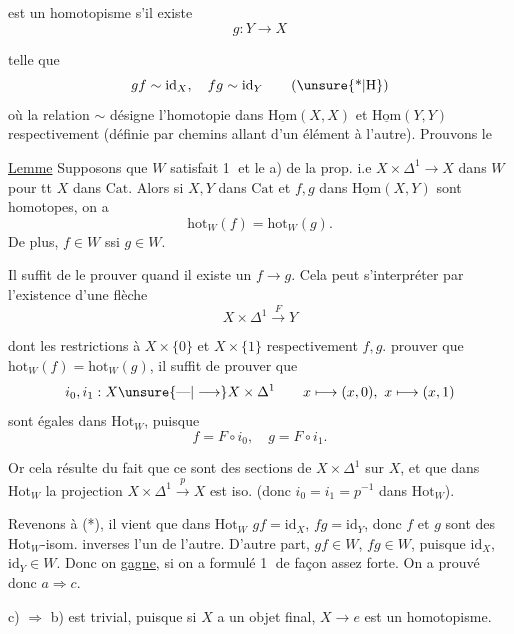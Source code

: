 
est un homotopisme s'il existe  
\[
g:Y\longrightarrow X
\]

telle que
\[
gf\sim\mathrm{id}_X,\quad fg\sim\mathrm{id}_Y \tag*{(\unsure{*|H})}
\]
où la relation $\sim$ désigne l'homotopie dans $\underline{\mathrm{Hom}}(X,X)$ et $\underline{\mathrm{Hom}}(Y,Y)$ respectivement (définie par chemins allant d'un élément à l'autre). Prouvons le

\uline{Lemme} Supposons que $W$ satisfait \textcircled{1} et le a) de la prop. i.e $X\times\Delta^1\longrightarrow X$ dans $W$ pour tt $X$ dans $\mathrm{Cat}$. Alors si  $X,Y$ dans $\mathrm{Cat}$ et $f,g$ dans $\underline{\mathrm{Hom}}(X,Y)$ sont homotopes, on a
\[
\mathrm{hot}_W(f)=\mathrm{hot}_W(g).
\]
De plus,  $f\in W$ ssi $g\in W$.

Il suffit de le prouver quand il existe un  $f\longrightarrow g$. Cela peut s'interpréter par l'existence d'une flèche
\[
X\times\Delta^1\xrightarrow{F}Y
\]

dont les restrictions à $X\times\{0\}$ et $X\times\{1\}$ respectivement  $f,g$.  prouver que $\mathrm{hot}_W(f)=\mathrm{hot}_W(g)$, il suffit de prouver que
\[
i_0,i_1:X\unsure{\text{---}|\longrightarrow}X\times\Delta^1
\qquad x\longmapsto(x,0),\ x\longmapsto(x,1)
\]
sont égales dans $\mathrm{Hot}_W$, puisque
\[
f=F\circ i_0,\quad g=F\circ i_1.
\]

Or cela résulte du fait que ce sont des sections de $X\times\Delta^1$ sur $X$, et que dans $\mathrm{Hot}_W$ la projection $X\times\Delta^1\xrightarrow{p}X$ est iso. (donc $i_0=i_1=p^{-1}$ dans $\mathrm{Hot}_W$).



Revenons à (*), il vient que dans $\mathrm{Hot}_W$ $gf=\mathrm{id}_X$, $fg=\mathrm{id}_Y$, donc $f$ et $g$ sont des $\mathrm{Hot}_W$-isom. inverses l'un de l'autre.  D'autre part, $gf\in W$, $fg\in W$,  puisque $\mathrm{id}_X$, $\mathrm{id}_Y\in W$. Donc on \uline{gagne}, si on a formulé \textcircled{1} de façon assez forte. On a prouvé donc $a\Rightarrow c$.

c) $\Rightarrow$ b) est trivial, puisque si $X$ a un objet final, $X\longrightarrow e$ est un homotopisme.

